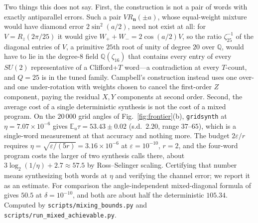 \documentclass[aps,prx,twocolumn,superscriptaddress,nofootinbib,longbibliography]{revtex4-2}
\theoremstyle{plain}
\theoremstyle{definition}
\theoremstyle{remark}
\newcommand{\E}{\mathbb{E}}
\newcommand{\Q}{\mathbb{Q}}
\begin{document}
Two things this does not say. First, the construction is not a pair of words with exactly antiparallel errors. Such a pair $VR_{\mathbf n}(\pm a)$, whose equal-weight mixture would have diamond error $2\sin^2(a/2)$, need not exist at all: for $V=R_z(2\pi/25)$ it would give $W_++W_-=2\cos(a/2)V$, so the ratio $\zeta_{25}^{-1}$ of the diagonal entries of $V$, a primitive $25$th root of unity of degree $20$ over $\Q$, would have to lie in the degree-$8$ field $\Q(\zeta_{16})$ that contains every entry of every $SU(2)$ representative of a Clifford+$T$ word---a contradiction at every $T$-count, and $Q=25$ is in the tuned family. Campbell's construction instead uses one over- and one under-rotation with weights chosen to cancel the first-order $Z$ component, paying the residual $X,Y$ components at second order. Second, the average cost of a single deterministic synthesis is not the cost of a mixed program. On the $20\,000$ grid angles of Fig.~\ref{fig:frontier}(b), \texttt{gridsynth} at $\eta=7.07\times10^{-6}$ gives $\E_u\tau=53.43\pm0.02$ (s.d.\ $2.20$, range $37$--$65$), which is a single-word measurement at that accuracy and nothing more. The budget $2\varepsilon/r$ requires $\eta=\sqrt{\varepsilon/(5r)}=3.16\times10^{-6}$ at $\varepsilon=10^{-10}$, $r=2$, and the four-word program costs the larger of two synthesis calls there, about $3\log_2(1/\eta)+2.7\approx57.5$ by Ross--Selinger scaling. Certifying that number means synthesizing both words at $\eta$ and verifying the channel error; we report it as an estimate. For comparison the angle-independent mixed-diagonal formula of~\cite{KLMPP,Bothe} gives $50.5$ at $\delta=10^{-10}$, and both are about half the deterministic $105.34$. Computed by \texttt{scripts/mixing\_bounds.py} and \texttt{scripts/run\_mixed\_achievable.py}.
\end{document}
